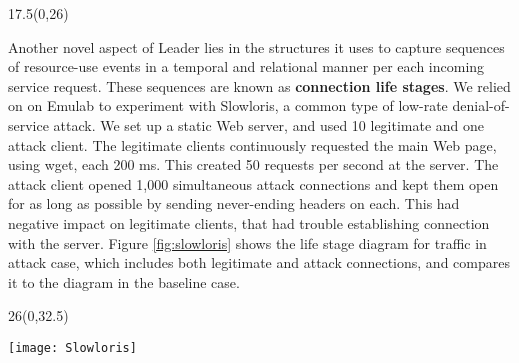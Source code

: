 \documentclass{article}
\begin{document}
\begin{textblock}{17.5}(0,26)
\begin{tcolorbox}[boxsep=10pt,colback=green!1!white]

Another novel aspect of Leader lies in the structures it uses to capture sequences of resource-use events in a temporal and relational manner per each incoming service request. These sequences are known as \textbf{connection life stages}. 
We relied on on Emulab to experiment with Slowloris, a common type of low-rate denial-of-service attack. We set up a static Web server, and used 10 legitimate and one attack client. The legitimate clients continuously requested the main Web page, using wget, each 200 ms. This created 50 requests per second at the server. The attack client opened 1,000 simultaneous attack connections and kept them open for as long as possible by sending never-ending headers on each. This had negative impact on legitimate clients, that had trouble establishing connection with the server. Figure \ref{fig:slowloris} shows the life stage diagram for traffic in attack case, which includes both legitimate
and attack connections, and compares it to the diagram in the baseline case.
\end{tcolorbox}
\end{textblock}

\begin{textblock}{26}(0,32.5)
\begin{tcolorbox}[boxsep=10pt,colback=yellow!1!white]
\begin{figure*} 
	\texttt{[image: Slowloris]}
	\caption{Life-stage diagrams for Slowloris attack: highlighted items show anomalies.  \label{fig:slowloris}}
\end{figure*}
\end{tcolorbox}
\end{textblock}
\end{document}
